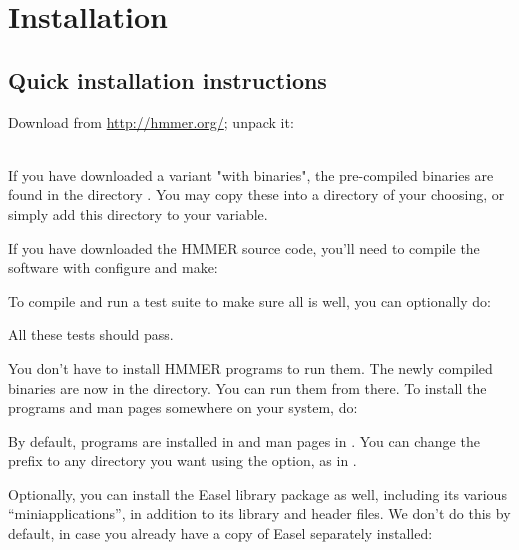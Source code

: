 \section{Installation}
\label{section:installation}
\setcounter{footnote}{0}

\subsection{Quick installation instructions}

Download  from \url{http://hmmer.org/};
unpack it:
\\
\\

If you have downloaded a variant "with binaries", the pre-compiled binaries are 
found in the directory . You may copy these into a directory of 
your choosing, or simply add this directory to your  variable.

If you have downloaded the HMMER source code, you'll need to compile the software
with configure and make:
\\ 

To compile and run a test suite to make sure all is well, you can
optionally do:


All these tests should pass.

You don't have to install HMMER programs to run them. The newly
compiled binaries are now in the  directory. You can run
them from there. To install the programs and man pages somewhere on
your system, do:


By default, programs are installed in  and man
pages in . You can change the
 prefix to any directory you want using the
 option, as in .

Optionally, you can install the Easel library package as well,
including its various ``miniapplications'', in addition to its library
and header files. We don't do this by default, in case you already
have a copy of Easel separately installed:

